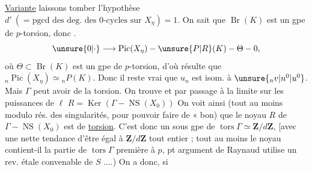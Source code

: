 \uline{Variante} laissons tomber l'hypothèse $d'\ (=\mathrm{pgcd}\text{ des deg. des 0-cycles sur }X_\eta)=1$.
On sait que $\operatorname{Br}(K)$ est un gpe de $p$-torsion, donc .
\[
\unsure{0|\cdot}\longrightarrow\operatorname{Pic}(X_\eta)\mathbin{-}\unsure{P|R}(K)\mathbin{-}\Theta\mathbin{-}0,
\]
où $\Theta\subset\operatorname{Br}(K)$ est un gpe de $p$-torsion, d'où résulte que ${}_n\operatorname{Pic}(X_\eta)\simeq{}_nP(K)$. Donc il reste vrai que $u_n$ est isom. à $\unsure{{}_nv|n^0|u^0}$. Mais $\Gamma$ peut avoir de la torsion. On trouve
 et par passage à la limite sur les puissances de $\ell$
$R=\operatorname{Ker}(\Gamma\mathbin{-}\operatorname{NS}(X_0))$
On voit ainsi (tout au moins modulo rés. des singularités, pour pouvoir faire  de « bon) que le noyau $R$ de $\Gamma\mathbin{-}\operatorname{NS}(X_0)$ est de \uline{torsion}.  C'est donc un sous gpe de $\operatorname{tors}\Gamma\simeq\mathbf Z/d\mathbf Z$, [avec une nette tendance d'être égal à $\mathbf Z/d\mathbf Z$ tout entier ;  tout au moins le noyau contient-il la partie de $\operatorname{tors}\Gamma$ première à $p$, pt argument de Raynaud utilise un rev. étale convenable de $S$ ....) On a donc, si
